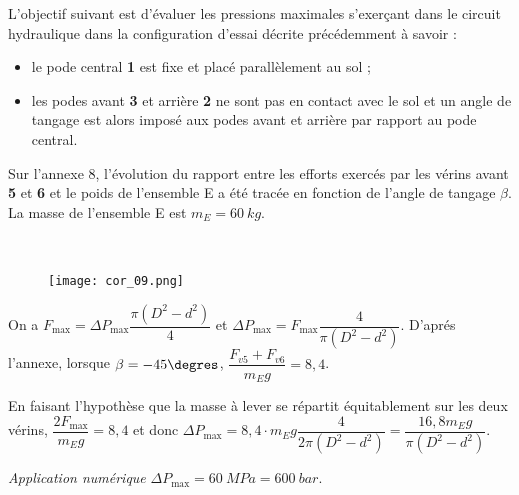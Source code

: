 L’objectif suivant est d’évaluer les pressions maximales s’exerçant dans le circuit hydraulique dans la configuration
d’essai décrite précédemment à savoir :
\begin{itemize}
\item le pode central \textbf{1} est fixe et placé parallèlement au sol ;
\item les podes avant \textbf{3} et arrière \textbf{2} ne sont pas en contact avec le sol et un angle de tangage est alors imposé aux podes avant et arrière par rapport au pode central.
\end{itemize}
Sur l’annexe 8, l’évolution du rapport entre les efforts exercés par les vérins avant \textbf{5} et \textbf{6} et le poids de l’ensemble E a été tracée en fonction de l’angle de tangage $\beta$. La masse de l’ensemble E est $m_E = \SI{60}{kg}$.

\ifprof
\begin{corrige}~\\
\begin{figure}[H]
\centering
\texttt{[image: cor\_09.png]}
\end{figure}
 
 On a $F_{\text{max}}=\Delta P_{\text{max}}\dfrac{\pi\left( D^2-d^2\right)}{4}$ et 
 $\Delta P_{\text{max}} = F_{\text{max}} \dfrac{4}{\pi\left( D^2-d^2\right)}$.
 D'aprés l'annexe, lorsque $\beta = -45\degres$, $\dfrac{F_{v5}+F_{v6}}{m_E g}=8,4$.
 
 En faisant l'hypothèse que la masse à lever se répartit équitablement sur les deux vérins, 
 $\dfrac{2F_{\text{max}}}{m_E g}=8,4$ et donc 
 $\Delta P_{\text{max}} = 8,4\cdot m_E g \dfrac{4}{2\pi\left( D^2-d^2\right)}=  \dfrac{16,8 m_E g}{\pi\left( D^2-d^2\right)}$.
 
 
 \textit{Application numérique }
  $\Delta P_{\text{max}} = \SI{60}{MPa} = \SI{600}{bar}$.
%


\end{corrige}


